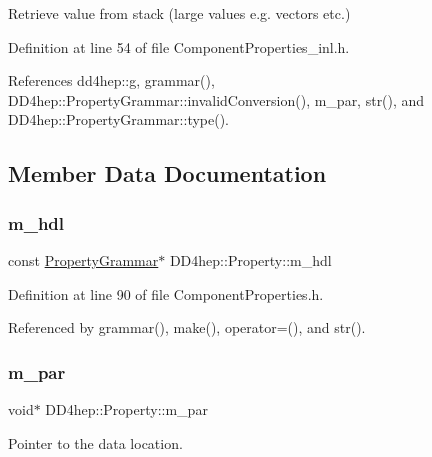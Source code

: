 Retrieve value from stack (large values e.\+g. vectors etc.) 



Definition at line 54 of file Component\+Properties\+\_\+inl.\+h.



References dd4hep\+::g, grammar(), D\+D4hep\+::\+Property\+Grammar\+::invalid\+Conversion(), m\+\_\+par, str(), and D\+D4hep\+::\+Property\+Grammar\+::type().



\subsection{Member Data Documentation}
\hypertarget{class_d_d4hep_1_1_property_acae0b73848d2a5c87ff18ef6b564b123}{}\label{class_d_d4hep_1_1_property_acae0b73848d2a5c87ff18ef6b564b123} 
\subsubsection{\texorpdfstring{m\+\_\+hdl}{m\_hdl}}
{\footnotesize\ttfamily const \hyperlink{class_d_d4hep_1_1_property_grammar}{Property\+Grammar}$\ast$ D\+D4hep\+::\+Property\+::m\+\_\+hdl\hspace{0.3cm}{\ttfamily [protected]}}



Definition at line 90 of file Component\+Properties.\+h.



Referenced by grammar(), make(), operator=(), and str().

\hypertarget{class_d_d4hep_1_1_property_a501e760077fb803d75419100c77d3ec4}{}\label{class_d_d4hep_1_1_property_a501e760077fb803d75419100c77d3ec4} 
\subsubsection{\texorpdfstring{m\+\_\+par}{m\_par}}
{\footnotesize\ttfamily void$\ast$ D\+D4hep\+::\+Property\+::m\+\_\+par\hspace{0.3cm}{\ttfamily [protected]}}



Pointer to the data location. 



